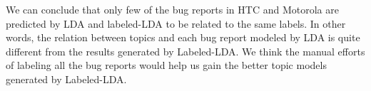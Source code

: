 \documentclass[10pt, conference, compsocconf]{IEEEtran}
\begin{document}
We can conclude that only few of the bug reports in HTC and Motorola are predicted by LDA and labeled-LDA to be related to the same labels. In other words, the relation between topics and each bug report modeled by LDA is quite different from the results generated by Labeled-LDA. We think the manual efforts of labeling all the bug reports would help us gain the better topic models generated by Labeled-LDA. 


\end{document}
